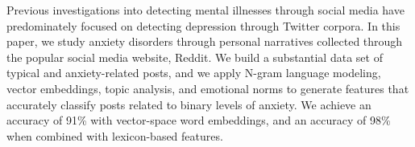 Previous investigations into detecting mental illnesses through social media have predominately focused on detecting depression through Twitter corpora. In this paper, we study anxiety disorders through personal narratives collected through the popular social media website, Reddit. We build a substantial data set of typical and anxiety-related posts, and we apply N-gram language modeling, vector embeddings, topic analysis, and emotional norms to generate features that accurately classify posts related to binary levels of anxiety. We achieve an accuracy of 91\% with vector-space word embeddings, and an accuracy of 98\% when combined with lexicon-based features.
